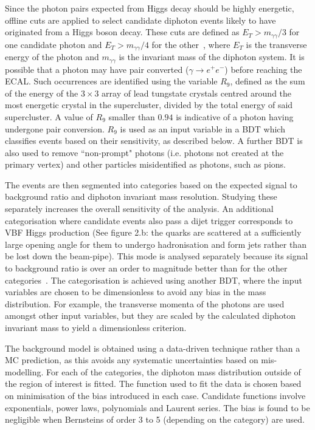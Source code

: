 \documentclass[10pt]{article}
\begin{document}
Since the photon pairs expected from Higgs decay should be highly energetic, offline cuts are applied to select candidate diphoton events likely to have originated from a Higgs boson decay. These cuts are defined as $E_T > m_{\gamma \gamma}/3$ for one candidate photon and $E_T > m_{\gamma \gamma}/4$ for the other~\cite{HSearch}, where $E_T$ is the transverse energy of the photon and $m_{\gamma\gamma}$ is the invariant mass of the diphoton system. It is possible that a photon may have pair converted ($\gamma \rightarrow e^+ e^-$) before reaching the ECAL. Such occurrences are identified using the variable $R_9$, defined as the sum of the energy of the $3 \times 3$ array of lead tungstate crystals centred around the most energetic crystal in the supercluster, divided by the total energy of said supercluster. A value of $R_9$ smaller than $0.94$ is indicative of a photon having undergone pair conversion. $R_9$ is used as an input variable in a BDT which classifies events based on their sensitivity, as described below. A further BDT is also used to remove “non-prompt" photons (i.e. photons not created at the primary vertex) and other particles misidentified as photons, such as pions.

The events are then segmented into categories based on the expected signal to background ratio and diphoton invariant mass resolution. Studying these separately increases the overall sensitivity of the analysis. An additional categorisation where candidate events also pass a dijet trigger corresponds to VBF Higgs production (See figure 2.b: the quarks are scattered at a sufficiently large opening angle for them to undergo hadronisation and form jets rather than be lost down the beam-pipe). This mode is analysed separately because its signal to background ratio is over an order to magnitude better than for the other categories~\cite{HSearch}. The categorisation is achieved using another BDT, where the input variables are chosen to be dimensionless to avoid any bias in the mass distribution. For example, the transverse momenta of the photons are used amongst other input variables, but they are scaled by the calculated diphoton invariant mass to yield a dimensionless criterion.

The background model is obtained using a data-driven technique rather than a MC prediction, as this avoids any systematic uncertainties based on mis-modelling. For each of the categories, the diphoton mass distribution outside of the region of interest is fitted. The function used to fit the data is chosen based on minimisation of the bias introduced in each case. Candidate functions involve exponentials, power laws, polynomials and Laurent series. The bias is found to be negligible when Bernsteins of order 3 to 5 (depending on the category) are used.
\end{document}

